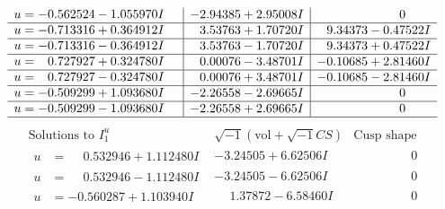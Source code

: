 \documentclass[1p]{elsarticle_modified}
\theoremstyle{definition}
\newcommand{\I}{\sqrt{-1}}
\begin{document}
$$\begin{array}{c|c|c}
\begin{aligned}
u &= -0.562524 - 1.055970 I\end{aligned}
 & -2.94385 + 2.95008 I & \phantom{-0.000000 } 0 \\ \hline\begin{aligned}
u &= -0.713316 + 0.364912 I\end{aligned}
 & \phantom{-}3.53763 + 1.70720 I & \phantom{-}9.34373 - 0.47522 I \\ \hline\begin{aligned}
u &= -0.713316 - 0.364912 I\end{aligned}
 & \phantom{-}3.53763 - 1.70720 I & \phantom{-}9.34373 + 0.47522 I \\ \hline\begin{aligned}
u &= \phantom{-}0.727927 + 0.324780 I\end{aligned}
 & \phantom{-}0.00076 - 3.48701 I & -0.10685 + 2.81460 I \\ \hline\begin{aligned}
u &= \phantom{-}0.727927 - 0.324780 I\end{aligned}
 & \phantom{-}0.00076 + 3.48701 I & -0.10685 - 2.81460 I \\ \hline\begin{aligned}
u &= -0.509299 + 1.093680 I\end{aligned}
 & -2.26558 - 2.69665 I & \phantom{-0.000000 } 0 \\ \hline\begin{aligned}
u &= -0.509299 - 1.093680 I\end{aligned}
 & -2.26558 + 2.69665 I & \phantom{-0.000000 } 0\\
 \hline 
 \end{array}$$\newpage$$\begin{array}{c|c|c}  
\text{Solutions to }I^u_{1}& \I (\text{vol} + \sqrt{-1}CS) & \text{Cusp shape}\\
 \hline 
\begin{aligned}
u &= \phantom{-}0.532946 + 1.112480 I\end{aligned}
 & -3.24505 + 6.62506 I & \phantom{-0.000000 } 0 \\ \hline\begin{aligned}
u &= \phantom{-}0.532946 - 1.112480 I\end{aligned}
 & -3.24505 - 6.62506 I & \phantom{-0.000000 } 0 \\ \hline\begin{aligned}
u &= -0.560287 + 1.103940 I\end{aligned}
 & \phantom{-}1.37872 - 6.58460 I & \phantom{-0.000000 } 0 \\ \hline\begin{aligned}

\end{aligned}
\end{array}$$
\end{document}
